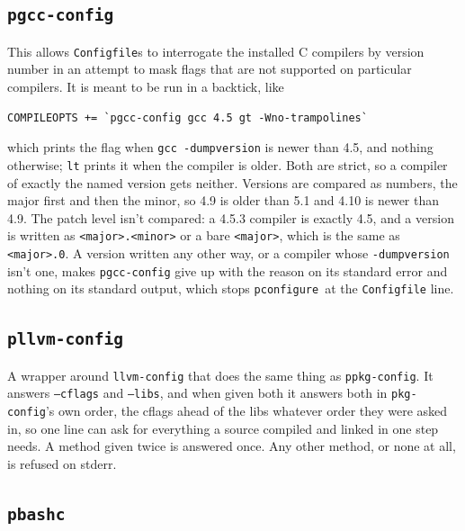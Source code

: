 \documentclass{article}
\newcommand{\pconfigure}{\texttt{pconfigure}}
\begin{document}
\subsection{\texttt{pgcc-config} \label{prog:pgcc-config}}

This allows \texttt{Configfile}s to interrogate the installed C
compilers by version number in an attempt to mask flags that are not
supported on particular compilers.  It is meant to be run in a
backtick, like
\begin{verbatim}
COMPILEOPTS += `pgcc-config gcc 4.5 gt -Wno-trampolines`
\end{verbatim}
which prints the flag when \texttt{gcc -dumpversion} is newer than
4.5, and nothing otherwise; \texttt{lt} prints it when the compiler
is older.  Both are strict, so a compiler of exactly the named
version gets neither.  Versions are compared as numbers, the major
first and then the minor, so 4.9 is older than 5.1 and 4.10 is newer
than 4.9.  The patch level isn't compared: a 4.5.3 compiler is
exactly 4.5, and a version is written as \texttt{<major>.<minor>} or
a bare \texttt{<major>}, which is the same as \texttt{<major>.0}.
A version written any other way, or a compiler whose
\texttt{-dumpversion} isn't one, makes \texttt{pgcc-config} give up
with the reason on its standard error and nothing on its standard
output, which stops \pconfigure\ at the \texttt{Configfile} line.

\subsection{\texttt{pllvm-config} \label{prog:pllvm-config}}

A wrapper around \texttt{llvm-config} that does the same thing as
\texttt{ppkg-config}.  It answers \texttt{--cflags} and
\texttt{--libs}, and when given both it answers both in
\texttt{pkg-config}'s own order, the cflags ahead of the libs whatever
order they were asked in, so one line can ask for everything a source
compiled and linked in one step needs.  A method given twice is
answered once.  Any other method, or none at all, is refused on
stderr.

\subsection{\texttt{pbashc} \label{prog:pbashc}}
\end{document}
